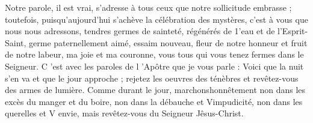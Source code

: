  Notre parole, il est vrai, s’adresse à tous ceux que notre sollicitude embrasse ; toutefois, puisqu’aujourd’hui s’achève la célébration des mystères, c’est à vous que nous nous adressons, tendres germes de sainteté, régénérés de 1’eau et de l’Esprit-Saint, germe paternellement aimé, essaim nouveau, fleur de notre honneur et fruit de notre labeur, ma joie et ma couronne, vous tous qui vous tenez fermes dans le Seigneur. C ’est avec les paroles de l ’Apôtre que je vous parle : Voici que la nuit s’en va et que le jour approche ; rejetez les oeuvres des ténèbres et revêtez-vous des armes de lumière. Comme durant le jour, marchonshonnêtement non dans les excès du manger et du boire, non dans la débauche et Vimpudicité, non dans les querelles et V envie, mais revêtez-vous du Seigneur Jêsus-Christ.